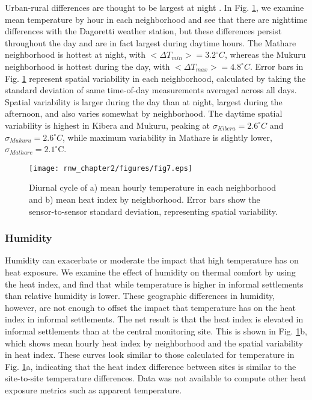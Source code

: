 Urban-rural differences are thought to be largest at night \cite{oke}. In Fig. \ref{diurnal}, we examine mean temperature by hour in each neighborhood and see that there are nighttime differences with the Dagoretti weather station, but these differences persist throughout the day and are in fact largest during daytime hours. 
The Mathare neighborhood is hottest at night, with $< \Delta T_{min}> = 3.2^\circ C$, whereas the Mukuru neighborhood is hottest during the day, with $< \Delta T_{max}> = 4.8^\circ C$. Error bars in Fig. \ref{diurnal} represent spatial variability in each neighborhood, calculated by taking the standard deviation of same time-of-day measurements averaged across all days. Spatial variability is larger during the day than at night, largest during the afternoon, and also varies somewhat by neighborhood. 
The daytime spatial variability is highest in Kibera and Mukuru, peaking at $\sigma_{Kibera} =2.6^\circ C$ and $\sigma_{Mukuru} = 2.6 ^\circ C$, while maximum variability in Mathare is slightly lower, $\sigma_{Mathare} = 2.1^ \circ  $C. %

\begin{figure}
\texttt{[image: rnw\_chapter2/figures/fig7.eps]}
\caption{%
Diurnal cycle of a) mean hourly temperature in each neighborhood and b) mean heat index by neighborhood. Error bars show the sensor-to-sensor standard deviation, representing spatial variability. }
\label{diurnal}
\end{figure}

\subsubsection{Humidity}
Humidity can exacerbate or moderate the impact that high temperature has on heat exposure.  We examine the effect of humidity on thermal comfort by using the heat index, and find that while temperature is higher in informal settlements than relative humidity is lower.
These geographic differences in humidity, however, are not enough to offset the impact that temperature has on the heat index in informal settlements. The net result is that the heat index is elevated in informal settlements than at the central monitoring site.
This is shown in Fig. \ref{diurnal}b, which shows mean hourly heat index by neighborhood and the spatial variability in heat index. These curves look similar to those calculated for temperature in Fig. \ref{diurnal}a, indicating that the heat index difference between sites is similar to the site-to-site temperature differences. Data was not available to compute other heat exposure metrics such as apparent temperature. 


